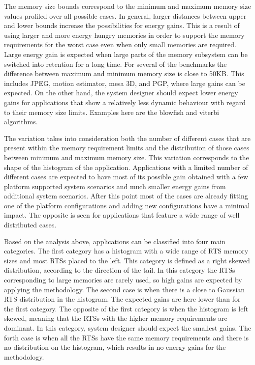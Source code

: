 The memory size bounds correspond to the minimum and maximum memory size values profiled over all possible cases. 
In general, larger distances between upper and lower bounds increase the possibilities for energy gains. 
This is a result of using larger and more energy hungry memories in order to support the memory requirements for the worst case even when only small memories are required. 
Large energy gain is expected when large parts of the memory subsystem can be switched into retention for a long time. 
For several of the benchmarks the difference between maximum and minimum memory size is close to 50KB. 
This includes JPEG, motion estimator, mesa 3D, and PGP, where large gains can be expected. 
On the other hand, the system designer should expect lower energy gains for applications that show a relatively less dynamic behaviour with regard to their memory size limits. 
Examples here are the blowfish and viterbi algorithms. 

The variation takes into consideration both the number of different cases that are present within the memory requirement limits and the distribution of those cases between minimum and maximum memory size. 
This variation corresponds to the shape of the histogram of the application.
Applications with a limited number of different cases are expected to have most of its possible gain obtained with a few platform supported system scenarios and much smaller energy gains from additional system scenarios. 
After this point most of the cases are already fitting one of the platform configurations and adding new configurations have a minimal impact. 
The opposite is seen for applications that feature a wide range of well distributed cases.

Based on the analysis above, applications can be classified into four main categories. 
The first category has a histogram with a wide range of RTS memory sizes and most RTSs placed to the left. This category is defined as a right skewed distribution, according to the direction of the tail.
In this category the RTSs corresponding to large memories are rarely used, so high gains are expected by applying the methodology.
The second case is when there is a close to Gaussian RTS distribution in the histogram. The expected gains are here lower than for the first category.
The opposite of the first category is when the histogram is left skewed, meaning that the RTSs with the higher memory requirements are dominant.
In this category, system designer should expect the smallest gains.
The forth case is when all the RTSs have the same memory requirements and there is no distribution on the histogram, which results in no energy gains for the methodology.

